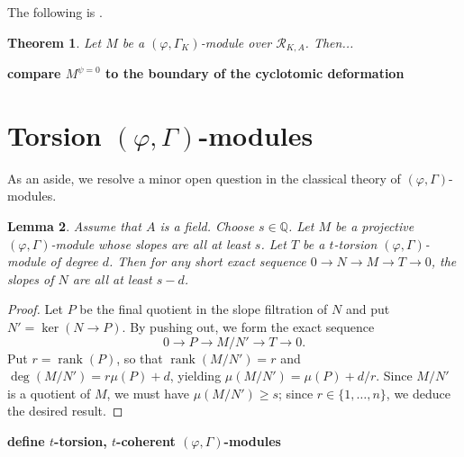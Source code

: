 \documentclass[12pt]{amsart}
\newtheorem{theorem}{Theorem}[section]
\newtheorem{lemma}[theorem]{Lemma}
\theoremstyle{definition}
\numberwithin{equation}{theorem}
\newcommand{\QQ}{\mathbb{Q}}
\newcommand{\calR}{\mathcal{R}}
\DeclareMathOperator{\rank}{rank}
\begin{document}
The following is \cite[Theorem~4.4.8]{kpx}.
\begin{theorem}
Let $M$ be a $(\varphi, \Gamma_K)$-module over $\calR_{K,A}$. Then...
\end{theorem}


\textbf{compare $M^{\psi=0}$ to the boundary of the cyclotomic deformation}

\appendix

\section{Torsion $(\varphi, \Gamma)$-modules}

As an aside, we resolve a minor open question in the classical theory of $(\varphi, \Gamma)$-modules.

\begin{lemma} \label{L:modification slope bound}
Assume that $A$ is a field. 
Choose $s \in \QQ$.
Let $M$ be a projective $(\varphi, \Gamma)$-module whose slopes are all at least $s$.
Let $T$ be a $t$-torsion $(\varphi, \Gamma)$-module of degree $d$.
Then for any short exact sequence $0 \to N \to M \to T \to 0$,
the slopes of $N$ are all at least $s-d$.
\end{lemma}
\begin{proof}
Let $P$ be the final quotient in the slope filtration of $N$ and put $N' = \ker(N \to P)$.
By pushing out, we form the exact sequence 
\[
0 \to P \to M/N' \to T \to 0.
\]
Put $r = \rank(P)$, so that $\rank(M/N') = r$ and  $\deg(M/N') = r \mu(P)  + d$, yielding  $\mu(M/N') = \mu(P) + d/r$. Since $M/N'$ is a quotient of $M$, we must have
 $\mu(M/N') \geq s$; since $r \in \{1,\dots,n\}$, we deduce the desired result.
\end{proof}



\textbf{define $t$-torsion, $t$-coherent $(\varphi, \Gamma)$-modules}
\end{document}
